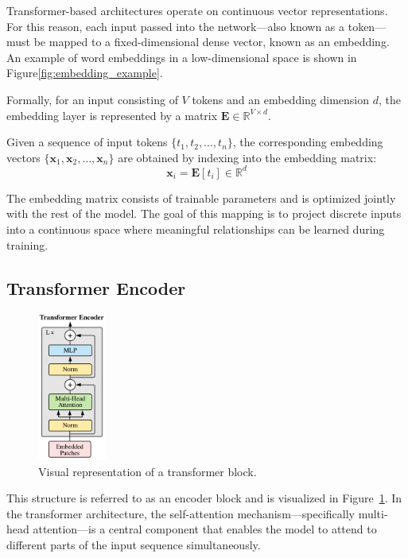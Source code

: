 \documentclass{pracalicmgr}
\begin{document}
Transformer-based architectures operate on continuous vector representations. For this reason, each input passed into the network—also known as a token—must be mapped to a fixed-dimensional dense vector, known as an embedding. An example of word embeddings in a low-dimensional space is shown in Figure\ref{fig:embedding_example}.

Formally, for an input consisting of \( V \) tokens and an embedding dimension \( d \), the embedding layer is represented by a matrix \( \mathbf{E} \in \mathbb{R}^{V \times d} \).

Given a sequence of input tokens \( \{t_1, t_2, \ldots, t_n\} \), the corresponding embedding vectors \( \{\mathbf{x}_1, \mathbf{x}_2, \ldots, \mathbf{x}_n\} \) are obtained by indexing into the embedding matrix:
\[
\mathbf{x}_i = \mathbf{E}[t_i] \in \mathbb{R}^d
\]

The embedding matrix consists of trainable parameters and is optimized jointly with the rest of the model. The goal of this mapping is to project discrete inputs into a continuous space where meaningful relationships can be learned during training.

\subsection{Transformer Encoder}

\begin{figure}[h]
    \centering
    \includegraphics[width=0.2\textwidth]{src/transformerEncoder.pdf}
    \caption{Visual representation of a transformer block.}
    \label{fig:transformerEncoder}
\end{figure}

This structure is referred to as an encoder block and is visualized in Figure~\ref{fig:transformerEncoder}. In the transformer architecture, the self-attention mechanism—specifically multi-head attention—is a central component that enables the model to attend to different parts of the input sequence simultaneously.
\end{document}
